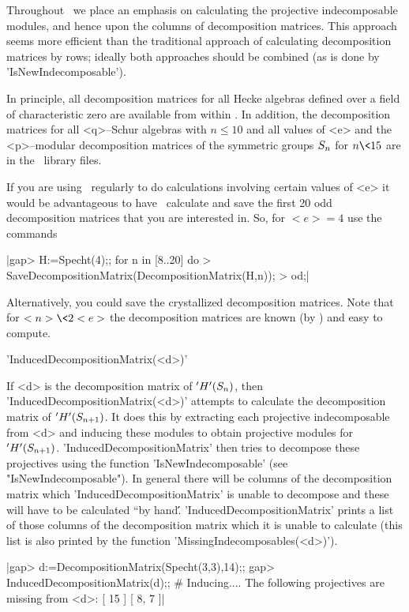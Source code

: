 Throughout \Specht\ we place an emphasis on calculating the projective
indecomposable modules, and hence upon the columns of decomposition 
matrices. This approach seems more efficient than the traditional approach
of calculating decomposition matrices by rows; ideally both approaches
should be combined (as is done by 'IsNewIndecomposable').

In principle, all decomposition matrices for all Hecke algebras defined
over a field of characteristic zero are available from within \Specht. In
addition, the decomposition matrices for all <q>--Schur algebras with
$n\le10$ and all values of <e> and the <p>--modular decomposition matrices 
of the symmetric groups $S_n$ for $n\<15$ are in the \Specht\ library
files.

If you are using \Specht\ regularly to do calculations involving certain
values of <e> it would be advantageous to have \Specht\ calculate and save
the first 20 odd decomposition matrices that you are interested in. So, 
for $<e>=4$ use the commands\:

|gap> H:=Specht(4);; for n in [8..20] do
>      SaveDecompositionMatrix(DecompositionMatrix(H,n));
>    od;|

Alternatively, you could save the crystallized decomposition matrices.
Note that for $<n>\<2<e>$ the decomposition matrices are known (by
\Specht) and easy to compute.



'InducedDecompositionMatrix(<d>)'

If <d> is the decomposition matrix of $'H'(S_n)$, then 
'InducedDecompositionMatrix(<d>)' attempts to calculate the decomposition 
matrix of $'H'(S_{n+1})$. It does this by extracting each projective 
indecomposable from <d> and inducing these modules to obtain projective 
modules for $'H'(S_{n+1})$.  'InducedDecompositionMatrix' then tries 
to decompose these projectives using the function 'IsNewIndecomposable' 
(see "IsNewIndecomposable"). In general there will be columns of the 
decomposition matrix which 'InducedDecompositionMatrix' is unable to 
decompose and these will have to be calculated ``by hand\'\'. 
'InducedDecompositionMatrix' prints a list of those columns of the 
decomposition matrix which it is unable to calculate (this list is also 
printed by the function 'MissingIndecomposables(<d>)').

|gap> d:=DecompositionMatrix(Specht(3,3),14);;
gap> InducedDecompositionMatrix(d);;
# Inducing....
The following projectives are missing from <d>:
    [ 15 ]  [ 8, 7 ]|

